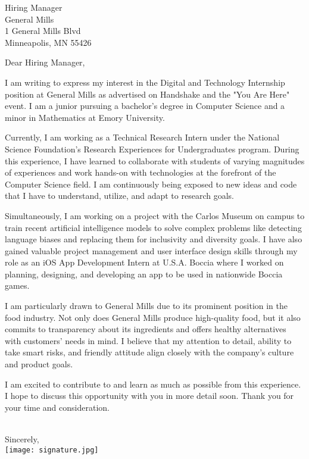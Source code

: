 \documentclass[letterpaper,12pt]{letter}
\date{}
\begin{document}
\begin{letter}{%
    Hiring Manager \\ 
    General Mills \\ 
    1 General Mills Blvd \\
	Minneapolis, MN 55426
}

\opening{Dear Hiring Manager,}

I am writing to express my interest in the Digital and Technology Internship position at General Mills 
as advertised on Handshake and the "You Are Here" event. I am a junior pursuing a bachelor's degree in 
Computer Science and a minor in Mathematics at Emory University.

Currently, I am working as a Technical Research Intern under the National Science Foundation's 
Research Experiences for Undergraduates program. During this experience, I have learned to 
collaborate with students of varying magnitudes of experiences and work hands-on with technologies at 
the forefront of the Computer Science field. I am continuously being exposed to new ideas 
and code that I have to understand, utilize, and adapt to research goals. 

Simultaneously, I am working on a project with the Carlos Museum on campus to train recent 
artificial intelligence models to solve complex problems like detecting language biases and 
replacing them for inclusivity and diversity goals. I have also gained valuable project management 
and user interface design skills through my role as an iOS App Development Intern at U.S.A. Boccia 
where I worked on planning, designing, and developing an app to be used in nationwide Boccia games. 

I am particularly drawn to General Mills due to its prominent position in the food industry. Not only
does General Mills produce high-quality food, but it also commits to transparency about its 
ingredients and offers healthy alternatives with customers' needs in mind. I believe that my 
attention to detail, ability to take smart risks, and friendly attitude align closely with 
the company's culture and product goals.

I am excited to contribute to and learn as much as possible from this experience. I hope to discuss
this opportunity with you in more detail soon. Thank you for your time and consideration. \\\\

\closing{Sincerely, \\
\vspace{10pt}
\texttt{[image: signature.jpg]}}


\end{letter}

\end{document}
